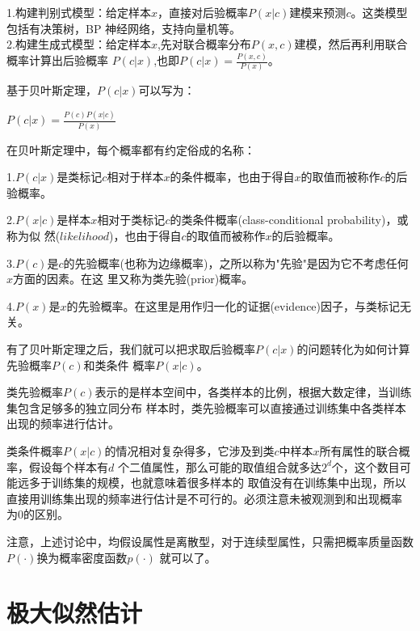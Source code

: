 \documentclass[UTF8]{ctexart}
\begin{document}
{1.构建判别式模型：给定样本$x$，直接对后验概率$P(x|c)$建模来预测$c$。这类模型包括有决策树，BP
神经网络，支持向量机等。\\[2ex]
2.构建生成式模型：给定样本$x$,先对联合概率分布$P(x,c)$建模，然后再利用联合概率计算出后验概率
$P(c|x)$,也即$P(c|x)=\frac{P(x,c)}{P(x)}$。\par
基于贝叶斯定理，$P(c|x)$可以写为：
\begin{center}
    \LARGE{
        $P(c|x)=\frac{P(c)P(x|c)}{P(x)}$
    }
\end{center}\par
在贝叶斯定理中，每个概率都有约定俗成的名称：\par
1.$P(c|x)$是类标记$c$相对于样本$x$的条件概率，也由于得自$x$的取值而被称作$c$的后验概率。\par
2.$P(x|c)$是样本$x$相对于类标记$c$的类条件概率(class-conditional probability)，或称为似
然($likelihood$)，也由于得自$c$的取值而被称作$x$的后验概率。\par
3.$P(c)$是$c$的先验概率(也称为边缘概率)，之所以称为"先验"是因为它不考虑任何$x$方面的因素。在这
里又称为类先验(prior)概率。\par
4.$P(x)$是$x$的先验概率。在这里是用作归一化的证据(evidence)因子，与类标记无关。\par
有了贝叶斯定理之后，我们就可以把求取后验概率$P(c|x)$的问题转化为如何计算先验概率$P(c)$和类条件
概率$P(x|c)$。\par
类先验概率$P(c)$表示的是样本空间中，各类样本的比例，根据大数定律，当训练集包含足够多的独立同分布
样本时，类先验概率可以直接通过训练集中各类样本出现的频率进行估计。\par
类条件概率$P(x|c)$的情况相对复杂得多，它涉及到类$c$中样本$x$所有属性的联合概率，假设每个样本有$d$
个二值属性，那么可能的取值组合就多达$2^d$个，这个数目可能远多于训练集的规模，也就意味着很多样本的
取值没有在训练集中出现，所以直接用训练集出现的频率进行估计是不可行的。必须注意未被观测到和出现概率
为0的区别。\par
注意，上述讨论中，均假设属性是离散型，对于连续型属性，只需把概率质量函数$P(·)$换为概率密度函数$p(·)$
就可以了。\newpage
\section{极大似然估计}
}
\end{document}
